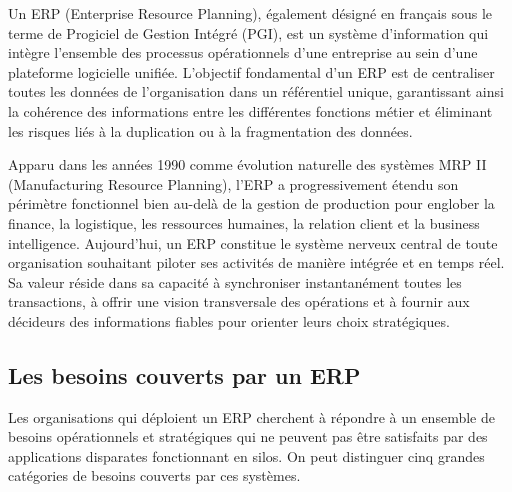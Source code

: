 \documentclass[a4paper,12pt]{report}
\begin{document}
Un ERP (Enterprise Resource Planning), également désigné en français sous le
terme de Progiciel de Gestion Intégré (PGI), est un système d'information qui
intègre l'ensemble des processus opérationnels d'une entreprise au sein d'une
plateforme logicielle unifiée. L'objectif fondamental d'un ERP est de centraliser
toutes les données de l'organisation dans un référentiel unique, garantissant
ainsi la cohérence des informations entre les différentes fonctions métier et
éliminant les risques liés à la duplication ou à la fragmentation des données.

Apparu dans les années 1990 comme évolution naturelle des systèmes MRP II
(Manufacturing Resource Planning), l'ERP a progressivement étendu son périmètre
fonctionnel bien au-delà de la gestion de production pour englober la finance,
la logistique, les ressources humaines, la relation client et la business
intelligence. Aujourd'hui, un ERP constitue le système nerveux central de toute
organisation souhaitant piloter ses activités de manière intégrée et en temps
réel. Sa valeur réside dans sa capacité à synchroniser instantanément toutes les
transactions, à offrir une vision transversale des opérations et à fournir aux
décideurs des informations fiables pour orienter leurs choix stratégiques.

\subsection{Les besoins couverts par un ERP}

Les organisations qui déploient un ERP cherchent à répondre à un ensemble de
besoins opérationnels et stratégiques qui ne peuvent pas être satisfaits par des
applications disparates fonctionnant en silos. On peut distinguer cinq grandes
catégories de besoins couverts par ces systèmes.
\end{document}
